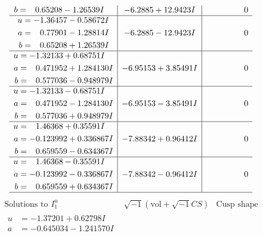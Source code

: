 \documentclass[1p]{elsarticle_modified}
\theoremstyle{definition}
\newcommand{\I}{\sqrt{-1}}
\begin{document}
$$\begin{array}{c|c|c}
\begin{aligned}
b &= \phantom{-}0.65208 - 1.26539 I\end{aligned}
 & -6.2885 + 12.9423 I & \phantom{-0.000000 } 0 \\ \hline\begin{aligned}
u &= -1.36457 - 0.58672 I \\
a &= \phantom{-}0.77901 - 1.28814 I \\
b &= \phantom{-}0.65208 + 1.26539 I\end{aligned}
 & -6.2885 - 12.9423 I & \phantom{-0.000000 } 0 \\ \hline\begin{aligned}
u &= -1.32133 + 0.68751 I \\
a &= \phantom{-}0.471952 + 1.284130 I \\
b &= \phantom{-}0.577036 - 0.948979 I\end{aligned}
 & -6.95153 + 3.85491 I & \phantom{-0.000000 } 0 \\ \hline\begin{aligned}
u &= -1.32133 - 0.68751 I \\
a &= \phantom{-}0.471952 - 1.284130 I \\
b &= \phantom{-}0.577036 + 0.948979 I\end{aligned}
 & -6.95153 - 3.85491 I & \phantom{-0.000000 } 0 \\ \hline\begin{aligned}
u &= \phantom{-}1.46368 + 0.35591 I \\
a &= -0.123992 + 0.336867 I \\
b &= \phantom{-}0.659559 - 0.634367 I\end{aligned}
 & -7.88342 + 0.96412 I & \phantom{-0.000000 } 0 \\ \hline\begin{aligned}
u &= \phantom{-}1.46368 - 0.35591 I \\
a &= -0.123992 - 0.336867 I \\
b &= \phantom{-}0.659559 + 0.634367 I\end{aligned}
 & -7.88342 - 0.96412 I & \phantom{-0.000000 } 0\\
 \hline 
 \end{array}$$\newpage$$\begin{array}{c|c|c}  
\text{Solutions to }I^u_{1}& \I (\text{vol} + \sqrt{-1}CS) & \text{Cusp shape}\\
 \hline 
\begin{aligned}
u &= -1.37201 + 0.62798 I \\
a &= -0.645034 - 1.241570 I \\

\end{aligned}
\end{array}$$
\end{document}
